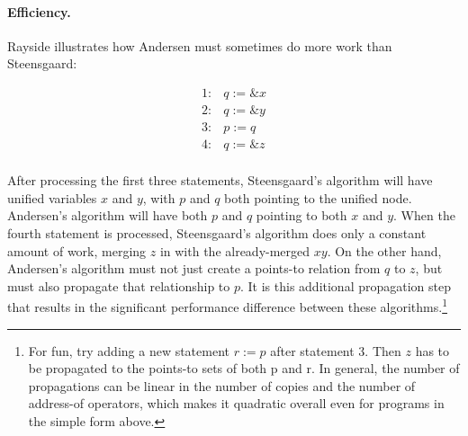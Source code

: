 \documentclass[11pt]{article}
\begin{document}
% 




\paragraph{Efficiency.} Rayside illustrates how Andersen must sometimes do more work than
Steensgaard:


\[
\begin{array}{ll}
1: & q := \&x\\
2: & q := \&y\\
3: & p := q\\
4: & q := \&z\\
\end{array}
\]

After processing the first three statements, Steensgaard's algorithm will have
unified variables $x$ and $y$, with $p$ and $q$ both pointing to the unified
node. Andersen's algorithm will have both $p$ and $q$ pointing to
both $x$ and $y$. When the fourth statement is processed, Steensgaard's
algorithm does only a constant amount of work, merging $z$ in with the
already-merged $xy$. On the other hand, Andersen's algorithm must not just
create a points-to relation from $q$ to $z$, but must also propagate that
relationship to $p$. It is this additional propagation step that results in the
significant performance difference between these algorithms.\footnote{For fun,
  try adding a new statement $r := p$ after statement 3. Then $z$ has to be
  propagated to the points-to sets of both p and r. In general, the number of
  propagations can be linear in the number of copies and the number of
  address-of operators, which makes it quadratic overall even for programs in
  the simple form above.}
\end{document}
